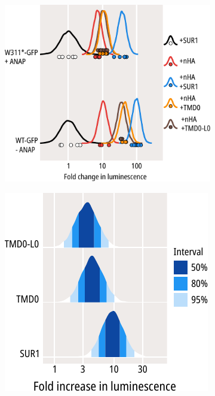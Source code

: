 \begin{figure}[h]
	\centering
	\begin{subfigure}[t]{0.45\textwidth}
		\caption{}\label{ch6fig:tmd0s_surface_expression_1}
		\centering
		\includegraphics[width=\textwidth]{tmd0s_surface_expression_1.pdf}
	\end{subfigure}
	\hfill
	\begin{subfigure}[t]{0.45\textwidth}
		\caption{}\label{ch6fig:tmd0s_surface_expression_2}
		\centering
		\includegraphics[width=\textwidth]{tmd0s_surface_expression_3.pdf}

\end{subfigure}
\end{figure}
